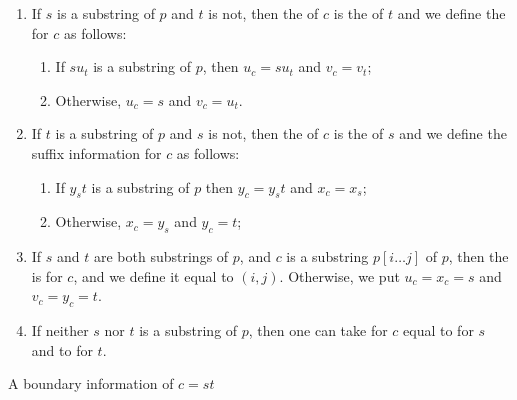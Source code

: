 \begin{algorithm}[!ht]
\centering
\begin{enumerate}
\item \label{case:s_is_substring} If $s$ is a substring of $p$ and $t$ is not,  then the  of $c$ is the  of $t$ and we define the  for $c$ as follows:
        \begin{enumerate} 
        \item  If $su_t$ is a substring of $p$, then $u_c=su_t$ and $v_c=v_t$;
        \item \label{case:t_is_substring} Otherwise, $u_c=s$ and $v_c=u_t$.
        \end{enumerate}
\item If $t$ is a substring of $p$ and $s$ is not, then the  of $c$ is the  of $s$ and we define the suffix information for $c$ as follows: 
        \begin{enumerate}
            \item \label{case:merge} If $y_s t$ is a substring of $p$ then $y_c=y_s t$ and $x_c=x_s$;
            \item \label{case:crop} Otherwise, $x_c=y_s$ and $y_c=t$;
        \end{enumerate}
\item \label{case:both_are_substring} If $s$ and $t$ are both substrings of $p$, and $c$ is a substring $p[i \dots j]$ of $p$, then the  is  for $c$, and we define it equal to $(i,j)$. Otherwise, we put $u_c=x_c=s$ and $v_c=y_c=t$. 

\item \label{case:none_is_substring} If neither $s$ nor $t$ is a substring of $p$, then one can take  for $c$ equal to  for $s$ and  to  for $t$. 
\end{enumerate}
\caption{A boundary information of $c = st$}
\label{alg:boundary}
\end{algorithm}

